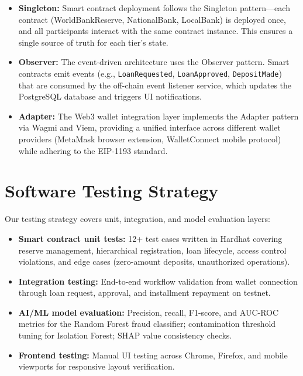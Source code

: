 \documentclass[12pt,a4paper]{report}
\begin{document}
\begin{itemize}[noitemsep]
\item \textbf{Singleton:} Smart contract deployment follows the Singleton pattern---each contract (WorldBankReserve, NationalBank, LocalBank) is deployed once, and all participants interact with the same contract instance. This ensures a single source of truth for each tier's state.

\item \textbf{Observer:} The event-driven architecture uses the Observer pattern. Smart contracts emit events (e.g., \texttt{LoanRequested}, \texttt{LoanApproved}, \texttt{DepositMade}) that are consumed by the off-chain event listener service, which updates the PostgreSQL database and triggers UI notifications.

\item \textbf{Adapter:} The Web3 wallet integration layer implements the Adapter pattern via Wagmi and Viem, providing a unified interface across different wallet providers (MetaMask browser extension, WalletConnect mobile protocol) while adhering to the EIP-1193 standard.
\end{itemize}


\section{Software Testing Strategy}

Our testing strategy covers unit, integration, and model evaluation layers:

\begin{itemize}[noitemsep]
\item \textbf{Smart contract unit tests:} 12+ test cases written in Hardhat covering reserve management, hierarchical registration, loan lifecycle, access control violations, and edge cases (zero-amount deposits, unauthorized operations).
\item \textbf{Integration testing:} End-to-end workflow validation from wallet connection through loan request, approval, and installment repayment on testnet.
\item \textbf{AI/ML model evaluation:} Precision, recall, F1-score, and AUC-ROC metrics for the Random Forest fraud classifier; contamination threshold tuning for Isolation Forest; SHAP value consistency checks.
\item \textbf{Frontend testing:} Manual UI testing across Chrome, Firefox, and mobile viewports for responsive layout verification.
\end{itemize}
\end{document}
